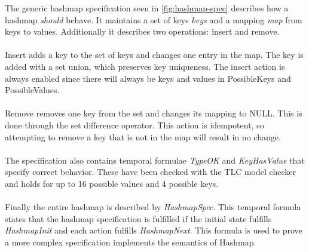 \documentclass{uit-thesis}
\begin{document}
The generic hashmap specification seen in \autoref{fig:hashmap-spec} describes how a hashmap \textit{should} behave. It maintains a set of keys \textit{keys} and a mapping \textit{map} from keys to values. Additionally it describes two operations: insert and remove.
\\\\
Insert adds a key to the set of keys and changes one entry in the map. The key is added with a set union, which preserves key uniqueness. The insert action is always enabled since there will always be keys and values in PossibleKeys and PossibleValues.
\\\\
Remove removes one key from the set and changes its mapping to NULL. This is done through the set difference operator. This action is idempotent, so attempting to remove a key that is not in the map will result in no change.
\\\\
The specification also contains temporal formulae \textit{TypeOK} and \textit{KeyHasValue} that specify correct behavior. These have been checked with the TLC model checker and holds for up to 16 possible values and 4 possible keys.
\\\\
Finally the entire hashmap is described by \textit{HashmapSpec}. This temporal formula states that the hashmap specification is fulfilled if the initial state fulfills \textit{HashmapInit} and each action fulfills \textit{HashmapNext}. This formula is used to prove a more complex specification implements the semantics of Hashmap.
\end{document}
